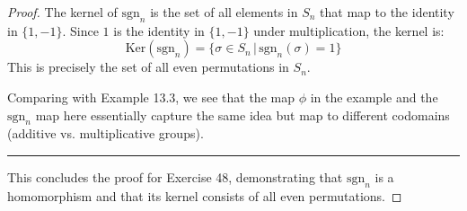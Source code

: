 \documentclass[12pt]{amsart}
\theoremstyle{definition}
\numberwithin{equation}{section}
\theoremstyle{plain}
\begin{document}
\begin{exercise}{48}
\begin{proof}
The kernel of \( \text{sgn}_n \) is the set of all elements in \( S_n \) that map to the identity in \( \{1,-1\} \). Since \( 1 \) is the identity in \( \{1,-1\} \) under multiplication, the kernel is:
\[ \text{Ker}(\text{sgn}_n) = \{ \sigma \in S_n \,|\, \text{sgn}_n(\sigma) = 1 \} \]
This is precisely the set of all even permutations in \( S_n \).

Comparing with Example 13.3, we see that the map \( \phi \) in the example and the \( \text{sgn}_n \) map here essentially capture the same idea but map to different codomains (additive vs. multiplicative groups).

\noindent\rule{\textwidth}{1pt}

This concludes the proof for Exercise 48, demonstrating that \( \text{sgn}_n \) is a homomorphism and that its kernel consists of all even permutations.
    \end{proof}
\end{exercise}
\end{document}
